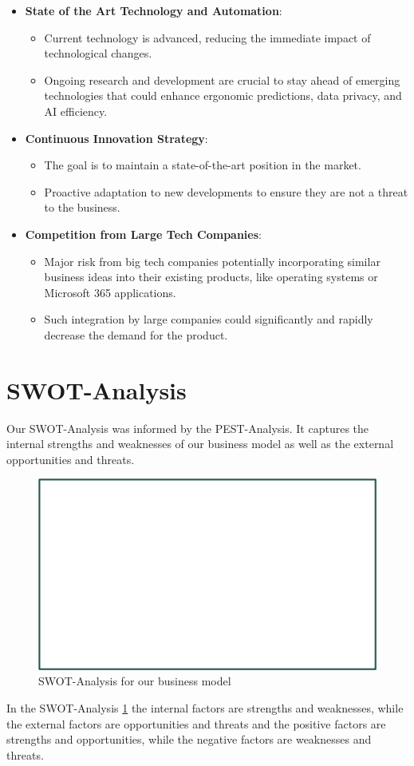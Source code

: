 \begin{itemize}
  \item \textbf{State of the Art Technology and Automation}:
  \begin{itemize}
    \item Current technology is advanced, reducing the immediate impact of technological changes.
    \item Ongoing research and development are crucial to stay ahead of emerging technologies that could enhance ergonomic predictions, data privacy, and AI efficiency.
  \end{itemize}

  \item \textbf{Continuous Innovation Strategy}:
  \begin{itemize}
    \item The goal is to maintain a state-of-the-art position in the market.
    \item Proactive adaptation to new developments to ensure they are not a threat to the business.
  \end{itemize}

  \item \textbf{Competition from Large Tech Companies}:
  \begin{itemize}
    \item Major risk from big tech companies potentially incorporating similar business ideas into their existing products, like operating systems or Microsoft 365 applications.
    \item Such integration by large companies could significantly and rapidly decrease the demand for the product.
  \end{itemize}
\end{itemize}

\section{SWOT-Analysis}

Our SWOT-Analysis was informed by the PEST-Analysis. It captures the internal strengths and weaknesses of our business model as well as the external opportunities and threats.

\begin{figure}[H]
    \includegraphics[width=\textwidth]{SWOT_analysis.png}
    \caption{SWOT-Analysis for our business model} 
    \label{fig:swot}
\end{figure}


In the SWOT-Analysis \ref{fig:swot} the internal factors are strengths and weaknesses, 
while the external factors are opportunities and threats and the positive factors are strengths and opportunities, 
while the negative factors are weaknesses and threats.